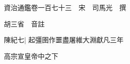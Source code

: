 






























































資治通鑑卷一百七十三　宋　司馬光　撰

胡三省　音註

陳紀七|{
	起彊圉作噩盡屠維大淵獻凡三年}


高宗宣皇帝中之下

